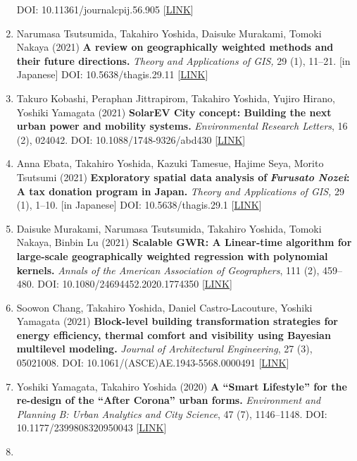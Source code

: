 \documentclass[
]{book}
\begin{document}
\begin{enumerate}
  DOI: 10.11361/journalcpij.56.905 {[}\href{https://www.jstage.jst.go.jp/article/journalcpij/56/3/56_905/_article/-char/en}{LINK}{]}
\item
  Narumasa Tsutsumida, Takahiro Yoshida, Daisuke Murakami, Tomoki Nakaya (2021)
  \textbf{A review on geographically weighted methods and their future directions.}
  \emph{Theory and Applications of GIS,} 29 (1), 11--21. {[}in Japanese{]}
  DOI: 10.5638/thagis.29.11 {[}\href{https://www.gisa-japan.org/dl/gisajounal.html}{LINK}{]}
\item
  Takuro Kobashi, Peraphan Jittrapirom, Takahiro Yoshida, Yujiro Hirano, Yoshiki Yamagata (2021)
  \textbf{SolarEV City concept: Building the next urban power and mobility systems.}
  \emph{Environmental Research Letters}, 16 (2), 024042.
  DOI: 10.1088/1748-9326/abd430 {[}\href{https://doi.org/10.1088/1748-9326/abd430}{LINK}{]}
\item
  Anna Ebata, Takahiro Yoshida, Kazuki Tamesue, Hajime Seya, Morito Tsutsumi (2021)
  \textbf{Exploratory spatial data analysis of} \textbf{\emph{Furusato Nozei}: A tax donation program in Japan.}
  \emph{Theory and Applications of GIS,} 29 (1), 1--10. {[}in Japanese{]}
  DOI: 10.5638/thagis.29.1 {[}\href{https://www.gisa-japan.org/dl/gisajounal.html}{LINK}{]}
\item
  Daisuke Murakami, Narumasa Tsutsumida, Takahiro Yoshida, Tomoki Nakaya, Binbin Lu (2021)
  \textbf{Scalable GWR: A Linear-time algorithm for large-scale geographically weighted regression with polynomial kernels.}
  \emph{Annals of the American Association of Geographers}, 111 (2), 459--480.
  DOI: 10.1080/24694452.2020.1774350 {[}\href{https://www.tandfonline.com/doi/full/10.1080/24694452.2020.1774350}{LINK}{]}
\item
  Soowon Chang, Takahiro Yoshida, Daniel Castro-Lacouture, Yoshiki Yamagata (2021) \textbf{Block-level building transformation strategies for energy efficiency, thermal comfort and visibility using Bayesian multilevel modeling.}
  \emph{Journal of Architectural Engineering}, 27 (3), 05021008.
  DOI: 10.1061/(ASCE)AE.1943-5568.0000491 {[}\href{https://ascelibrary.org/doi/abs/10.1061/\%28ASCE\%29AE.1943-5568.0000491}{LINK}{]}
\item
  Yoshiki Yamagata, Takahiro Yoshida (2020)
  \textbf{A ``Smart Lifestyle'' for the re-design of the ``After Corona'' urban forms.}
  \emph{Environment and Planning B: Urban Analytics and City Science}, 47 (7), 1146--1148.
  DOI: 10.1177/2399808320950043 {[}\href{http://dx.doi.org/10.1177/2399808320950043}{LINK}{]}
\item

\end{enumerate}
\end{document}

